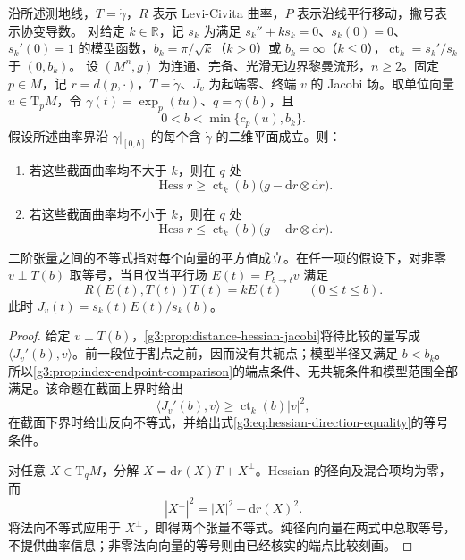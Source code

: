 \begin{theorem}\label{g3:thm:hessian-comparison}
	沿所述测地线，\(T=\dot\gamma\)，\(R\) 表示 Levi-Civita 曲率，\(P\) 表示沿线平行移动，撇号表示协变导数。
	对给定 \(k\in\mathbb R\)，记 \(s_k\) 为满足 \(s_k''+ks_k=0\)、\(s_k(0)=0\)、\(s_k'(0)=1\) 的模型函数，\(b_k=\pi/\sqrt k\)（\(k>0\)）或 \(b_k=\infty\)（\(k\le0\)），\(\operatorname{ct}_k=s_k'/s_k\) 于 \((0,b_k)\)。
	设 \((M^n,g)\) 为连通、完备、光滑无边界黎曼流形，\(n\ge2\)。固定 \(p\in M\)，记 \(r=d(p,\cdot)\)，\(T=\dot\gamma\)、\(J_v\) 为起端零、终端 \(v\) 的 Jacobi 场。取单位向量 \(u\in\mathrm T_pM\)，令 \(\gamma(t)=\exp_p(tu)\)、\(q=\gamma(b)\)，且
	\[
		0<b<\min\{c_p(u),b_k\}.
	\]
	假设所述曲率界沿 \(\gamma|_{[0,b]}\) 的每个含 \(\dot\gamma\) 的二维平面成立。则：
	\begin{enumerate}
		\item 若这些截面曲率均不大于 \(k\)，则在 \(q\) 处
		\begin{equation}\label{g3:eq:hessian-comparison-lower}
			\operatorname{Hess}r
			\ge\operatorname{ct}_k(b)
			\bigl(g-\mathrm dr\otimes\mathrm dr\bigr).
		\end{equation}
		\item 若这些截面曲率均不小于 \(k\)，则在 \(q\) 处
		\begin{equation}\label{g3:eq:hessian-comparison-upper}
			\operatorname{Hess}r
			\le\operatorname{ct}_k(b)
			\bigl(g-\mathrm dr\otimes\mathrm dr\bigr).
		\end{equation}
	\end{enumerate}
	二阶张量之间的不等式指对每个向量的平方值成立。在任一项的假设下，对非零 \(v\perp T(b)\) 取等号，当且仅当平行场 \(E(t)=P_{b\to t}v\) 满足
	\begin{equation}\label{g3:eq:hessian-direction-equality}
		R(E(t),T(t))T(t)=kE(t)\qquad(0\le t\le b).
	\end{equation}
	此时 \(J_v(t)=s_k(t)E(t)/s_k(b)\)。
\end{theorem}
\begin{proof}
	给定 \(v\perp T(b)\)，\cref{g3:prop:distance-hessian-jacobi}将待比较的量写成
	\(\langle J_v'(b),v\rangle\)。前一段位于割点之前，因而没有共轭点；模型半径又满足 \(b<b_k\)。所以\cref{g3:prop:index-endpoint-comparison}的端点条件、无共轭条件和模型范围全部满足。该命题在截面上界时给出
	\[
		\langle J_v'(b),v\rangle
		\ge\operatorname{ct}_k(b)|v|^2,
	\]
	在截面下界时给出反向不等式，并给出式\eqref{g3:eq:hessian-direction-equality}的等号条件。

	对任意 \(X\in\mathrm T_qM\)，分解
	\(X=\mathrm dr(X)T+X^\perp\)。Hessian 的径向及混合项均为零，而
	\[
		|X^\perp|^2
		=|X|^2-\mathrm dr(X)^2.
	\]
	将法向不等式应用于 \(X^\perp\)，即得两个张量不等式。纯径向向量在两式中总取等号，不提供曲率信息；非零法向向量的等号则由已经核实的端点比较刻画。
\end{proof}

